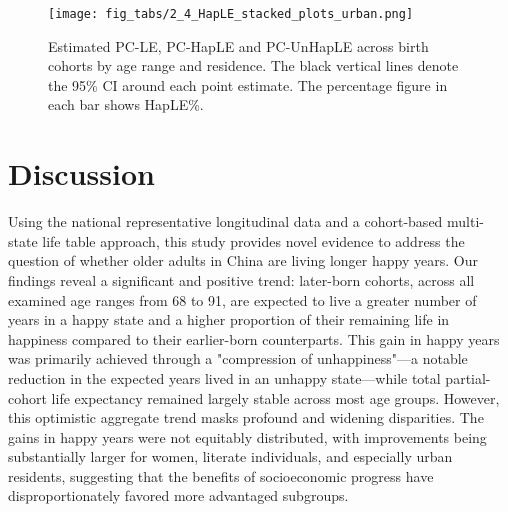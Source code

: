 \documentclass[12pt, a4paper]{article}
\begin{document}
\begin{figure}[!p]
  \centering
  \texttt{[image: fig\_tabs/2\_4\_HapLE\_stacked\_plots\_urban.png]}
  \caption{Estimated PC-LE, PC-HapLE and PC-UnHapLE across birth cohorts by age range and residence. The black vertical lines denote the 95\% CI around each point estimate. The percentage figure in each bar shows HapLE\%.}
\end{figure}

\section{Discussion}

Using the national representative longitudinal data and a cohort-based multi-state life table approach, this study provides novel evidence to address the question of whether older adults in China are living longer happy years. Our findings reveal a significant and positive trend: later-born cohorts, across all examined age ranges from 68 to 91, are expected to live a greater number of years in a happy state and a higher proportion of their remaining life in happiness compared to their earlier-born counterparts. This gain in happy years was primarily achieved through a "compression of unhappiness"—a notable reduction in the expected years lived in an unhappy state—while total partial-cohort life expectancy remained largely stable across most age groups. However, this optimistic aggregate trend masks profound and widening disparities. The gains in happy years were not equitably distributed, with improvements being substantially larger for women, literate individuals, and especially urban residents, suggesting that the benefits of socioeconomic progress have disproportionately favored more advantaged subgroups.
\end{document}
